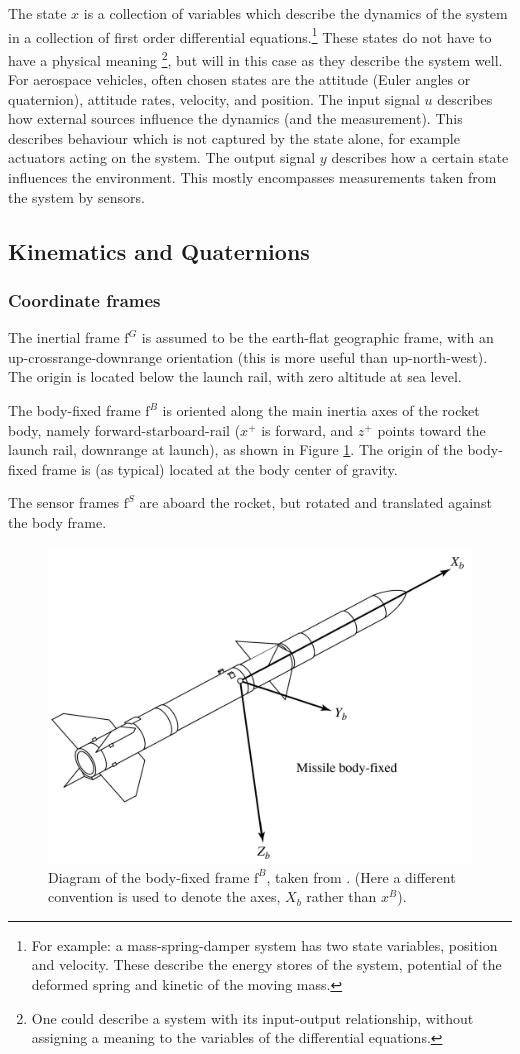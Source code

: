 The state $x$ is a collection of variables which describe the dynamics of the system in a collection of first order differential equations.\footnote{For example: a mass-spring-damper system has two state variables, position and velocity. These describe the energy stores of the system, potential of the deformed spring and kinetic of the moving mass.}
These states do not have to have a physical meaning \footnote{One could describe a system with its input-output relationship, without assigning a meaning to the variables of the differential equations.}, but will in this case as they describe the system well.
For aerospace vehicles, often chosen states are the attitude (Euler angles or quaternion), attitude rates, velocity, and position. 
The input signal $u$ describes how external sources influence the dynamics (and the measurement). 
This describes behaviour which is not captured by the state alone, for example actuators acting on the system.
The output signal $y$ describes how a certain state influences the environment.
This mostly encompasses measurements taken from the system by sensors.


\subsection{Kinematics and Quaternions}
\subsubsection{Coordinate frames}

The inertial frame $\mathrm{f}^G$ is assumed to be the earth-flat geographic frame, with an up-crossrange-downrange orientation (this is more useful than up-north-west).
The origin is located below the launch rail, with zero altitude at sea level.

The body-fixed frame $\mathrm{f}^B$ is oriented along the main inertia axes of the rocket body, namely forward-starboard-rail ($x^+$ is forward, and $z^+$ points toward the launch rail, downrange at launch), as shown in Figure \ref{fig:model-frame-rocket}.
The origin of the body-fixed frame is (as typical) located at the body center of gravity.

The sensor frames $\mathrm{f}^{S}$ are aboard the rocket, but rotated and translated against the body frame.

\begin{figure}[ht]
    \centering
    \includegraphics[width=0.45\linewidth]{images-design/model-coordinates-rocket.png}
    \caption[Diagram of the body-fixed frame $\mathrm{f}^B$]{Diagram of the body-fixed frame $\mathrm{f}^B$, taken from \cite{siouris2004}. (Here a different convention is used to denote the axes, $X_b$ rather than $x^B$). }
    \label{fig:model-frame-rocket}
\end{figure}

